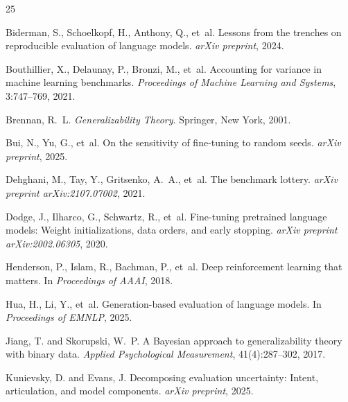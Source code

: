 \documentclass[11pt]{article}
\begin{document}

\begin{thebibliography}{25}

Biderman, S., Schoelkopf, H., Anthony, Q., et~al.
\newblock Lessons from the trenches on reproducible evaluation of language models.
\newblock \emph{arXiv preprint}, 2024.

Bouthillier, X., Delaunay, P., Bronzi, M., et~al.
\newblock Accounting for variance in machine learning benchmarks.
\newblock \emph{Proceedings of Machine Learning and Systems}, 3:747--769, 2021.

Brennan, R.~L.
\newblock \emph{Generalizability Theory}.
\newblock Springer, New York, 2001.

Bui, N., Yu, G., et~al.
\newblock On the sensitivity of fine-tuning to random seeds.
\newblock \emph{arXiv preprint}, 2025.

Dehghani, M., Tay, Y., Gritsenko, A.~A., et~al.
\newblock The benchmark lottery.
\newblock \emph{arXiv preprint arXiv:2107.07002}, 2021.

Dodge, J., Ilharco, G., Schwartz, R., et~al.
\newblock Fine-tuning pretrained language models: Weight initializations, data orders, and early stopping.
\newblock \emph{arXiv preprint arXiv:2002.06305}, 2020.

Henderson, P., Islam, R., Bachman, P., et~al.
\newblock Deep reinforcement learning that matters.
\newblock In \emph{Proceedings of AAAI}, 2018.

Hua, H., Li, Y., et~al.
\newblock Generation-based evaluation of language models.
\newblock In \emph{Proceedings of EMNLP}, 2025.

Jiang, T. and Skorupski, W.~P.
\newblock A {Bayesian} approach to generalizability theory with binary data.
\newblock \emph{Applied Psychological Measurement}, 41(4):287--302, 2017.

Kunievsky, D. and Evans, J.
\newblock Decomposing evaluation uncertainty: Intent, articulation, and model components.
\newblock \emph{arXiv preprint}, 2025.


\end{thebibliography}
\end{document}
